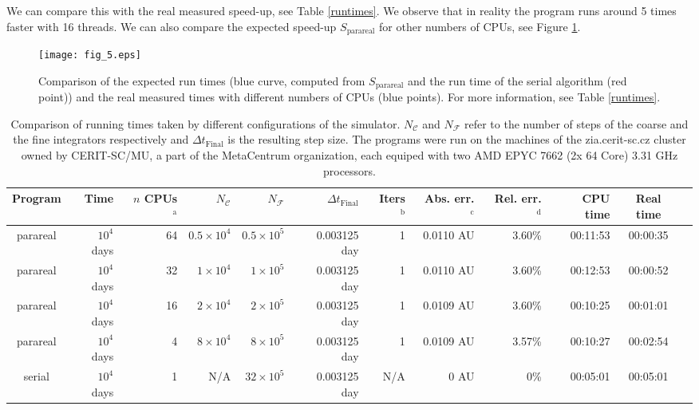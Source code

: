 \documentclass[conference]{IEEEtran}
\begin{document}
We can compare this with the real measured speed-up, see Table \ref{runtimes}. We observe that in reality the program runs around 5 times faster with 16 threads. We can also compare the expected speed-up $S_\text{parareal}$ for other numbers of CPUs, see Figure \ref{speeds}.

\begin{figure}[htbp]
\centerline{\texttt{[image: fig\_5.eps]}}
\caption{Comparison of the expected run times (blue curve, computed from $S_\text{parareal}$ and the run time of the serial algorithm (red point)) and the real measured times with different numbers of CPUs (blue points). For more information, see Table \ref{runtimes}.}
\label{speeds}
\end{figure}

\begin{table*}[htbp]
\caption{Comparison of running times taken by different configurations of the simulator. 
$N_\mathcal{C}$ and $N_\mathcal{F}$ refer to the number of steps of the coarse and the fine integrators respectively and $\Delta t_{\text{Final}}$ is the resulting step size.
The programs were run on the machines of the zia.cerit-sc.cz cluster owned by CERIT-SC/MU, a part of the MetaCentrum organization, each equiped with two AMD EPYC 7662 (2x 64 Core) 3.31 GHz processors.}
\begin{center}
\begin{tabular}{crrrrrrrrrcc}
\toprule
Program & Time & $n$ CPUs $^{\mathrm{a}}$ & $N_\mathcal{C}$ & $N_\mathcal{F}$ & $\Delta t_{\text{Final}}$ & Iters $^{\mathrm{b}}$ & Abs. err. $^{\mathrm{c}}$ & Rel. err. $^{\mathrm{d}}$ & CPU time & Real time \\
\midrule
parareal & $10^4$ days & 64 & $0.5\times10^4$ &  $0.5\times10^5$ & 0.003125 day & 1 & 0.0110 AU & 3.60\% & 00:11:53 & 00:00:35 \\
parareal & $10^4$ days & 32 & $1\times10^4$ &  $1\times10^5$ & 0.003125 day & 1 & 0.0110 AU & 3.60\% & 00:12:53 & 00:00:52 \\
parareal & $10^4$ days & 16 & $2\times10^4$ &  $2\times10^5$ & 0.003125 day & 1 & 0.0109 AU & 3.60\% & 00:10:25 & 00:01:01 \\
parareal & $10^4$ days & 4 & $8\times10^4$ &  $8\times10^5$ & 0.003125 day & 1 & 0.0109 AU & 3.57\% & 00:10:27 & 00:02:54 \\
serial & $10^4$ days & 1 & N/A & $32\times10^5$ & 0.003125 day & N/A & 0 AU & 0\% & 00:05:01 & 00:05:01 \\

\end{tabular}
\end{center}
\end{table*}
\end{document}
